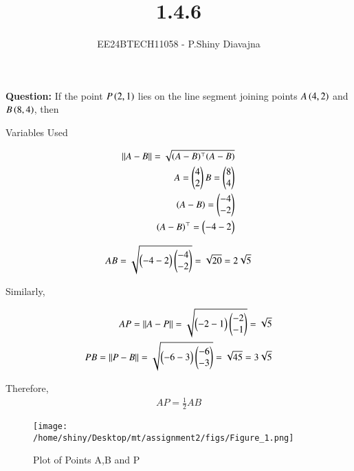 \documentclass[journal]{IEEEtran}
\begin{document}

\vspace{3cm}

\title{1.4.6}
\author{EE24BTECH11058 - P.Shiny Diavajna}
{\let\newpage\relax\maketitle}

\renewcommand{\thefigure}{\theenumi}
\renewcommand{\thetable}{\theenumi}
\setlength{\intextsep}{10pt} %


\renewcommand{\thetable}{\theenumi}

\textbf{Question:} If the point $P\left(2,1\right)$ lies on the line segment joining points $A\left(4,2\right)$ and $B\left(8,4\right)$, then \\

   \solution
   \begin{table}[h!]    
     \centering
     
     \caption{Variables Used}
     \label{tab10.5.3.9.1}
   \end{table}


   \begin{align*}
      ||A-B||=\sqrt{(A-B)^\top(A-B)}\\
      A=\begin{pmatrix}4\\2\end{pmatrix} B=\begin{pmatrix}8\\4\end{pmatrix}\\
      (A-B)=\begin{pmatrix}-4\\-2\end{pmatrix}\\
      (A-B)^\top=\begin{pmatrix}-4 -2\end{pmatrix}
   \end{align*}

   \begin{align*}
      AB=\sqrt{\begin{pmatrix}-4 -2\end{pmatrix} \begin{pmatrix}-4\\-2\end{pmatrix}} =\sqrt{20}=2\sqrt{5}\\
   \end{align*}
   
   Similarly,

   \begin{align*}
      AP=||A-P||=\sqrt{\begin{pmatrix}-2 -1\end{pmatrix} \begin{pmatrix}-2\\-1\end{pmatrix}}=\sqrt{5}\\
      PB=||P-B||=\sqrt{\begin{pmatrix}-6 -3\end{pmatrix} \begin{pmatrix}-6\\-3\end{pmatrix}}=\sqrt{45}=3\sqrt{5}\\
   \end{align*}

 Therefore,
 \begin{align*}
     AP=\frac{1}{2}AB
 \end{align*}

  \begin{figure}[h]
    \centering
    \texttt{[image: /home/shiny/Desktop/mt/assignment2/figs/Figure\_1.png]}
    \caption{Plot of Points A,B and P}
 \end{figure}
\end{document}
